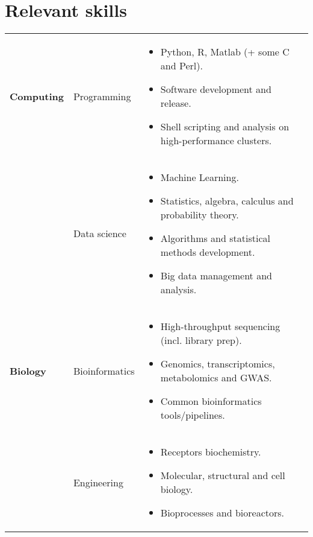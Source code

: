 \documentclass{CV}
\begin{document}
\section*{Relevant skills}
\begin{tabular}{p{} p{} p{}}
\textbf{Computing} & 
	Programming &
		\begin{itemize}\setlength\itemsep{-0.5em}
		\vspace{-1.8em}
		\item Python, R, Matlab (+ some C and Perl).
		\item Software development and release.
		\item Shell scripting and analysis on high-performance clusters.
		\end{itemize}\\
& 
	Data science &
		\begin{itemize}\setlength\itemsep{-0.5em}
		\vspace{-1.8em}
		\item Machine Learning.
		\item Statistics, algebra, calculus and probability theory.
		\item Algorithms and statistical methods development.
		\item Big data management and analysis.
		\end{itemize}\\
		
\textbf{Biology} & 
	Bioinformatics &
		\begin{itemize}\setlength\itemsep{-0.5em}
		\vspace{-1.8em}
		\item High-throughput sequencing (incl. library prep).
		\item Genomics, transcriptomics, metabolomics and GWAS.
		\item Common bioinformatics tools/pipelines.
		\end{itemize}\\
& 
	Engineering &
		\begin{itemize}\setlength\itemsep{-0.5em}
		\vspace{-1.8em}
		\item Receptors biochemistry.
		\item Molecular, structural and cell biology.
		\item Bioprocesses and bioreactors.
		\end{itemize}\\
		

\end{tabular}
\end{document}
